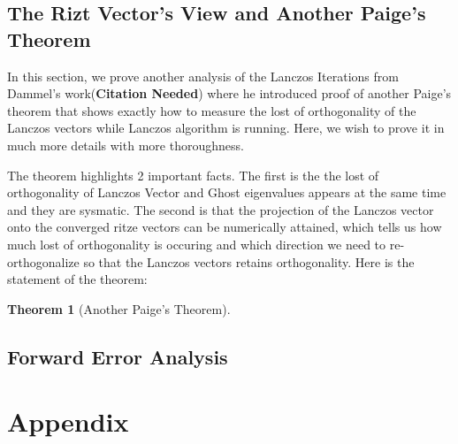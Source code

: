\documentclass[]{article}
\theoremstyle{definition}
\newtheorem{theorem}{Theorem}            %
\begin{document}
    \subsection{The Rizt Vector's View and Another Paige's Theorem}
        In this section, we prove another analysis of the Lanczos Iterations from Dammel's work(\textbf{Citation Needed}) where he introduced proof of another Paige's theorem that shows exactly how to measure the lost of orthogonality of the Lanczos vectors while Lanczos algorithm is running. Here, we wish to prove it in much more details with more thoroughness.
        \par
        The theorem highlights 2 important facts. The first is the the lost of orthogonality of Lanczos Vector and Ghost eigenvalues appears at the same time and they are sysmatic. The second is that the projection of the Lanczos vector onto the converged ritze vectors can be numerically attained, which tells us how much lost of orthogonality is occuring and which direction we need to re-orthogonalize so that the Lanczos vectors retains orthogonality. Here is the statement of the theorem: 
        \begin{theorem}[Another Paige's Theorem]
            
        \end{theorem}
    \subsection{Forward Error Analysis}


\newpage
\section{Appendix}
\end{document}
